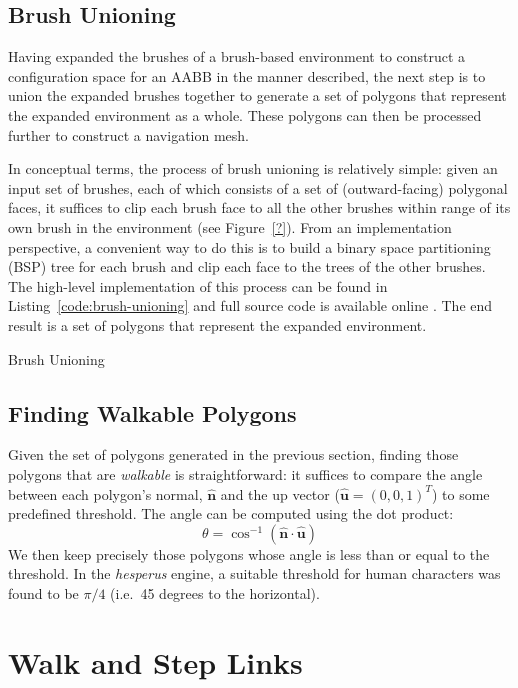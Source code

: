 \documentclass[10pt,twocolumn]{article}
\begin{document}
\subsection{Brush Unioning}

Having expanded the brushes of a brush-based environment to construct a configuration space for an AABB in the manner described, the next step is to union the expanded brushes together to generate a set of polygons that represent the expanded environment as a whole. These polygons can then be processed further to construct a navigation mesh.

In conceptual terms, the process of brush unioning is relatively simple: given an input set of brushes, each of which consists of a set of (outward-facing) polygonal faces, it suffices to clip each brush face to all the other brushes within range of its own brush in the environment (see Figure~\ref{?}). From an implementation perspective, a convenient way to do this is to build a binary space partitioning (BSP) tree for each brush and clip each face to the trees of the other brushes. The high-level implementation of this process can be found in Listing~\ref{code:brush-unioning} and full source code is available online \cite{hesperus}. The end result is a set of polygons that represent the expanded environment.

\begin{stulisting}[t]
\caption{Brush Unioning}
\label{code:brush-unioning}

\end{stulisting}

\subsection{Finding Walkable Polygons}

Given the set of polygons generated in the previous section, finding those polygons that are \emph{walkable} is straightforward: it suffices to compare the angle between each polygon's normal, $\mathbf{\hat{n}}$ and the up vector ($\mathbf{\hat{u}} = (0,0,1)^T$) to some predefined threshold. The angle can be computed using the dot product:
%
\[
\theta = \cos^{-1} \left( \mathbf{\hat{n}} \cdot \mathbf{\hat{u}} \right)
\]
%
We then keep precisely those polygons whose angle is less than or equal to the threshold. In the \emph{hesperus} engine, a suitable threshold for human characters was found to be $\pi/4$ (i.e.~45 degrees to the horizontal).

\section{Walk and Step Links}
\label{sec:walkstep}
\end{document}
